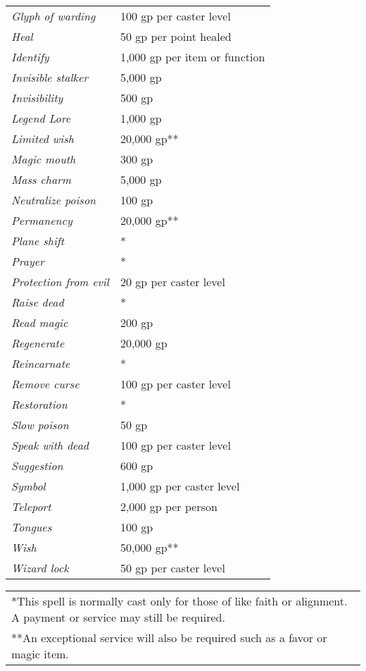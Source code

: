 \begin{multicols}{2}
\begin{minipage}{\columnwidth}
\begin{tabular}{|p{}|p{}|}
\textit{Glyph of warding}	& 100 gp per caster level \\
\rowcolor[gray]{.9}\textit{Heal}	& 50 gp per point healed \\
\textit{Identify}	& 1,000 gp per item or function \\
\rowcolor[gray]{.9}\textit{Invisible stalker}	& 5,000 gp \\
\textit{Invisibility}	& 500 gp \\
\rowcolor[gray]{.9}\textit{Legend Lore}	& 1,000 gp \\
\textit{Limited wish}	& 20,000 gp** \\
\rowcolor[gray]{.9}\textit{Magic mouth}	& 300 gp \\
\textit{Mass charm}	& 5,000 gp \\
\rowcolor[gray]{.9}\textit{Neutralize poison}	& 100 gp \\
\textit{Permanency}	& 20,000 gp** \\
\rowcolor[gray]{.9}\textit{Plane shift}	& * \\
\textit{Prayer}	& * \\
\rowcolor[gray]{.9}\textit{Protection from evil}	& 20 gp per caster level \\
\textit{Raise dead}	& * \\
\rowcolor[gray]{.9}\textit{Read magic}	& 200 gp \\
\textit{Regenerate}	& 20,000 gp \\
\rowcolor[gray]{.9}\textit{Reincarnate}	& * \\
\textit{Remove curse}	& 100 gp per caster level \\
\rowcolor[gray]{.9}\textit{Restoration}	& * \\
\textit{Slow poison}	& 50 gp \\
\rowcolor[gray]{.9}\textit{Speak with dead}	& 100 gp per caster level \\
\textit{Suggestion}	& 600 gp \\
\rowcolor[gray]{.9}\textit{Symbol}	& 1,000 gp per caster level \\
\textit{Teleport}	& 2,000 gp per person \\
\rowcolor[gray]{.9}\textit{Tongues}	& 100 gp \\
\textit{Wish}	& 50,000 gp** \\
\rowcolor[gray]{.9}\textit{Wizard lock}	& 50 gp per caster level \\
\hline
\end{tabular}
\noindent\begin{tabular}{p{}}
*This spell is normally cast only for those of like faith or alignment. A payment or service may still be required. \\
**An exceptional service will also be required such as a favor or magic item. \\
\end{tabular}\vspace{.5em}


\end{minipage}
\end{multicols}
